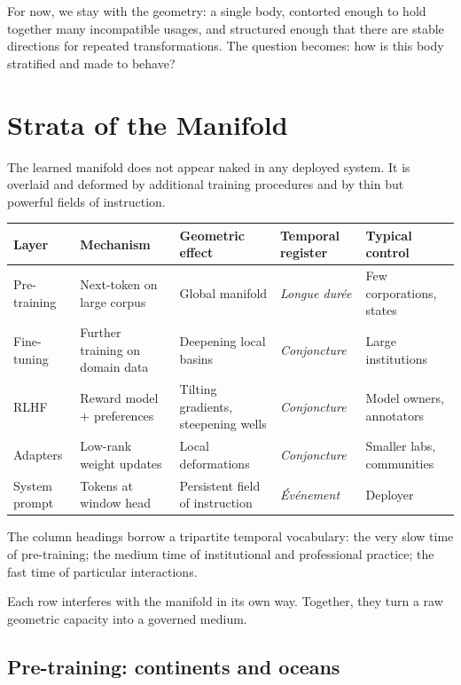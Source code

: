\documentclass[12pt,a4paper]{book}
\begin{document}
For now, we stay with the geometry: a single body, contorted enough to hold together many incompatible usages, and structured enough that there are stable directions for repeated transformations. The question becomes: how is this body stratified and made to behave?

\section{Strata of the Manifold}

The learned manifold does not appear naked in any deployed system. It is overlaid and deformed by additional training procedures and by thin but powerful fields of instruction.

\begin{formalbox}[title={Strata of the manifold}]
\begin{tabular}{@{}lllll@{}}
\toprule
\textbf{Layer} & \textbf{Mechanism} & \textbf{Geometric effect} & \textbf{Temporal register} & \textbf{Typical control} \\
\midrule
Pre-training   & Next-token on large corpus & Global manifold                & \emph{Longue dur\'{e}e} & Few corporations, states \\
Fine-tuning    & Further training on domain data& Deepening local basins     & \emph{Conjoncture}      & Large institutions        \\
RLHF           & Reward model + preferences & Tilting gradients, steepening wells & \emph{Conjoncture} & Model owners, annotators  \\
Adapters       & Low-rank weight updates    & Local deformations             & \emph{Conjoncture}      & Smaller labs, communities \\
System prompt  & Tokens at window head      & Persistent field of instruction& \emph{\'{E}v\'{e}nement} & Deployer                  \\
\bottomrule
\end{tabular}
\end{formalbox}

The column headings borrow a tripartite temporal vocabulary: the very slow time of pre-training; the medium time of institutional and professional practice; the fast time of particular interactions.

Each row interferes with the manifold in its own way. Together, they turn a raw geometric capacity into a governed medium.

\subsection*{Pre-training: continents and oceans}
\end{document}
